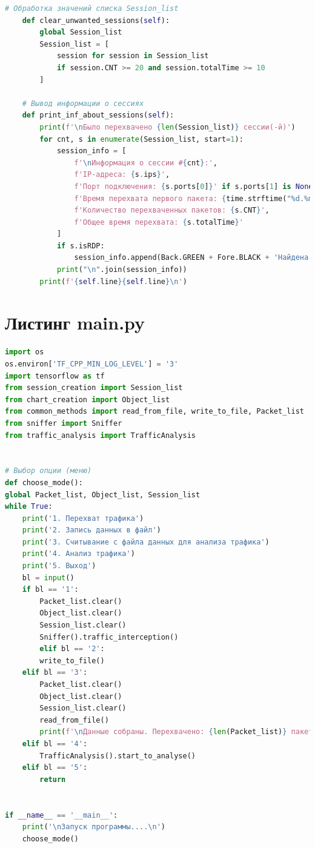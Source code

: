 \documentclass[bachelor, och, coursework]{SCWorks}
\begin{document}
\begin{lstlisting}[language=Python]
    # Обработка значений списка Session_list
    def clear_unwanted_sessions(self):
        global Session_list
        Session_list = [
            session for session in Session_list
            if session.CNT >= 20 and session.totalTime >= 10
        ]
    
    # Вывод информации о сессиях
    def print_inf_about_sessions(self):
        print(f'\nБыло перехвачено {len(Session_list)} сессии(-й)')
        for cnt, s in enumerate(Session_list, start=1):
            session_info = [
                f'\nИнформация о сессии #{cnt}:',
                f'IP-адреса: {s.ips}',
                f'Порт подключения: {s.ports[0]}' if s.ports[1] is None else f'Порты подключения: {s.ports}',
                f'Время перехвата первого пакета: {time.strftime("%d.%m.%Y г. %H:%M:%S", time.localtime(s.strt_time))}',
                f'Количество перехваченных пакетов: {s.CNT}',
                f'Общее время перехвата: {s.totalTime}'
            ]
            if s.isRDP:
                session_info.append(Back.GREEN + Fore.BLACK + 'Найдена RDP-сессия!!!')
            print("\n".join(session_info))
        print(f'{self.line}{self.line}\n')
    \end{lstlisting}


    \section{Листинг main.py}

    \begin{lstlisting}[language=Python]
import os
os.environ['TF_CPP_MIN_LOG_LEVEL'] = '3'
import tensorflow as tf
from session_creation import Session_list
from chart_creation import Object_list
from common_methods import read_from_file, write_to_file, Packet_list
from sniffer import Sniffer
from traffic_analysis import TrafficAnalysis


# Выбор опции (меню)
def choose_mode():
global Packet_list, Object_list, Session_list
while True:
    print('1. Перехват трафика')
    print('2. Запись данных в файл')
    print('3. Считывание с файла данных для анализа трафика')
    print('4. Анализ трафика')
    print('5. Выход')
    bl = input()
    if bl == '1':
        Packet_list.clear()
        Object_list.clear()
        Session_list.clear()
        Sniffer().traffic_interception()
        elif bl == '2':
        write_to_file()
    elif bl == '3':
        Packet_list.clear()
        Object_list.clear()
        Session_list.clear()
        read_from_file()
        print(f'\nДанные собраны. Перехвачено: {len(Packet_list)} пакетов(-а)\n')
    elif bl == '4':
        TrafficAnalysis().start_to_analyse()
    elif bl == '5':
        return  


if __name__ == '__main__':
    print('\nЗапуск программы....\n')
    choose_mode()
    \end{lstlisting}
\end{document}
